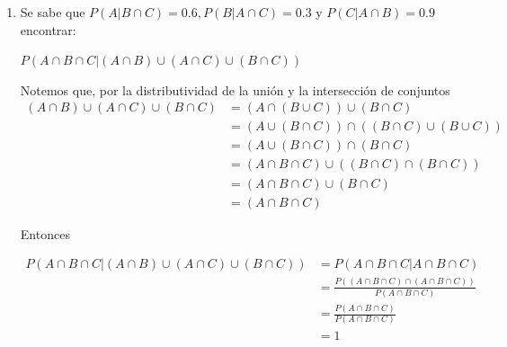 \documentclass[12pt,a4paper]{report}
\begin{document}
\begin{enumerate}
{\begin{enumerate}[label=\alph*) ]
{			Entonces
			\begin{equation*}
				P(A|B \cap C) = \frac{P(A \cap B \cap C)}{P(B \cap C)} = \frac{\frac{1}{20}}{\frac{1}{10}}	= \frac{10}{20} = \frac{1}{2}
			\end{equation*}
		 }

		 \item{
		 	Se sabe que $P(A|B\cap C)=0.6, P(B|A\cap C)=0.3$ y $P(C|A\cap B)=0.9$ encontrar: \\
		 	\begin{center}
		 	$P(A\cap B\cap C| (A\cap B) \cup (A\cap C) \cup (B\cap C))$
		 	\end{center}
			Notemos que, por la distributividad de la unión y la intersección de conjuntos
			\begin{align*}
				(A\cap B) \cup (A\cap C) \cup (B\cap C) &= (A \cap (B \cup C)) \cup (B \cap C)\\
				 																				&= (A \cup (B \cap C)) \cap ((B \cap C) \cup (B \cup C))\\
																								&= (A \cup (B \cap C)) \cap (B \cap C)\\
																								&= (A \cap B \cap C) \cup ((B \cap C) \cap (B \cap C))\\
																								&= (A \cap B \cap C) \cup (B \cap C)\\
																								&= (A \cap B \cap C)
			\end{align*}

			Entonces

			\begin{align*}
				P(A\cap B\cap C| (A\cap B) \cup (A\cap C) \cup (B\cap C)) &= P(A\cap B\cap C | A\cap B\cap C)\\
																																	&= \frac{P((A\cap B\cap C) \cap (A\cap B\cap C))}{P(A\cap B\cap C)}\\
																																	&= \frac{P(A\cap B\cap C)}{P(A\cap B\cap C)}\\
																																	&= 1
			\end{align*}
		 }
		 \end{enumerate}
  }



\end{enumerate}
\end{document}
